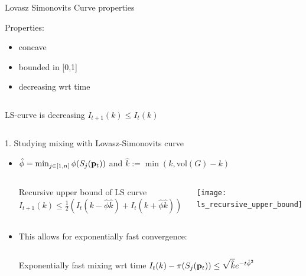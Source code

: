 \documentclass[../main.tex]{subfiles}
\begin{document}
	\begin{frame}{Lovasz Simonovits Curve properties}
    
          	Properties: 
          	\begin{itemize}
          		\item concave
          		\item bounded in [0,1]
          		\item decreasing wrt time
          	\end{itemize}
     
         
     
		\begin{columns}
			\begin{block}{LS-curve is decreasing} 
				$I_{t+1}(k) \leq I_{t}(k)$
			\end{block}
    	\end{columns}
    \end{frame}
    
    \begin{frame}{1. Studying mixing with Lovasz-Simonovits curve}
        \begin{itemize}
            \item $\hat{\phi} = \min_{j\in[1,n]}\phi(S_j(\bold{p}_t))$ and $\hat{k}:=\min(k, \text{vol}(G)-k)$
                \begin{columns}
                    \begin{block}{Recursive upper bound of LS curve}
                        $I_{t+1}(k) \leq \frac{1}{2}(I_t(k-\hat{\phi} \hat{k}) + I_t(k+\hat{\phi} \hat{k}))$
                    \end{block}
                	\column{0.5\textwidth}
                	\texttt{[image: ls\_recursive\_upper\_bound]}
                \end{columns}
           \item This allows for exponentially fast convergence:
                \begin{columns}
                    \begin{block}{Exponentially fast mixing wrt time}
                        $I_{t}(k) - \pi(S_j(\bold{p}_t)) \leq \sqrt{\hat{k}}e^{-t \hat{\phi}^2}$
                    \end{block}
                \end{columns}
        \end{itemize}
    \end{frame}
    
\end{document}
